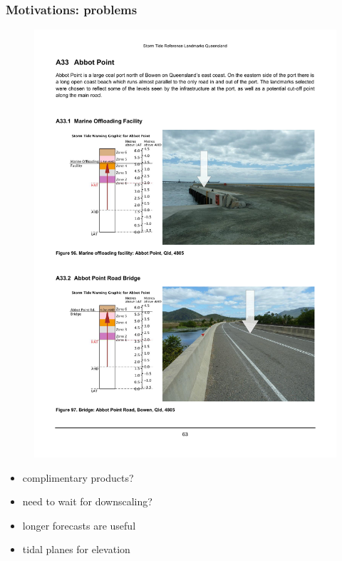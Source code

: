 \begin{frame}
\end{frame}
\begin{frame}
\frametitle{Motivations: problems}
\begin{minipage}{0.3\textwidth}
    \begin{figure}      
    \includegraphics[trim={2cm 0 3cm 5cm},clip,height=\textheight]{figures/images/qldLandmarkEg.pdf}
    \end{figure}
\end{minipage}
\hfill
\begin{minipage}{0.5\textwidth}   %
  \begin{itemize}
      \item complimentary products?
      \item need to wait for downscaling?
      \item longer forecasts are useful
      \item tidal planes for elevation 
  \end{itemize}
\end{minipage}

\end{frame}

